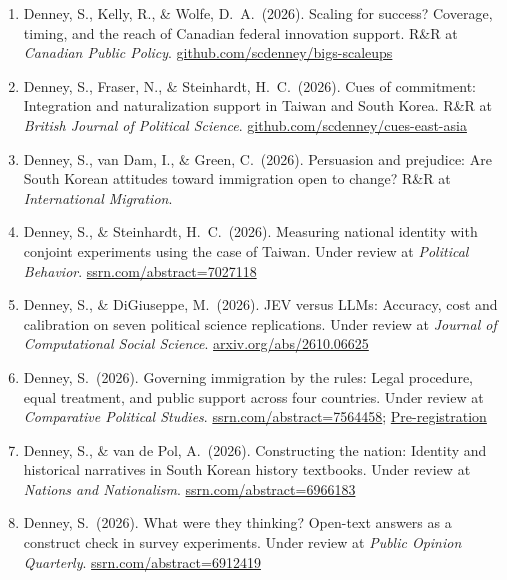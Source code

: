 \documentclass[11pt, a4paper]{article}
\begin{document}
\begin{enumerate}[itemsep=0.15em]
  \item Denney, S., Kelly, R., \& Wolfe, D.\ A.\ (2026). Scaling for success? Coverage, timing, and the reach of Canadian federal innovation support. R\&R at \textit{Canadian Public Policy}. \href{https://github.com/scdenney/bigs-scaleups}{github.com/scdenney/bigs-scaleups}

  \item Denney, S., Fraser, N., \& Steinhardt, H.\ C.\ (2026). Cues of commitment: Integration and naturalization support in Taiwan and South Korea. R\&R at \textit{British Journal of Political Science}. \href{https://github.com/scdenney/cues-east-asia}{github.com/scdenney/cues-east-asia}

  \item Denney, S., van Dam, I., \& Green, C.\ (2026). Persuasion and prejudice: Are South Korean attitudes toward immigration open to change? R\&R at \textit{International Migration}.

  \item Denney, S., \& Steinhardt, H.\ C.\ (2026). Measuring national identity with conjoint experiments using the case of Taiwan. Under review at \textit{Political Behavior}. \href{https://ssrn.com/abstract=7027118}{ssrn.com/abstract=7027118}

  \item Denney, S., \& DiGiuseppe, M.\ (2026). JEV versus LLMs: Accuracy, cost and calibration on seven political science replications. Under review at \textit{Journal of Computational Social Science}. \href{https://arxiv.org/abs/2610.06625}{arxiv.org/abs/2610.06625}

  \item Denney, S.\ (2026). Governing immigration by the rules: Legal procedure, equal treatment, and public support across four countries. Under review at \textit{Comparative Political Studies}. \href{https://ssrn.com/abstract=7564458}{ssrn.com/abstract=7564458}; \href{https://scdenney.github.io/assets/preregistrations/procedural-legitimacy/}{Pre-registration}

  \item Denney, S., \& van de Pol, A.\ (2026). Constructing the nation: Identity and historical narratives in South Korean history textbooks. Under review at \textit{Nations and Nationalism}. \href{https://ssrn.com/abstract=6966183}{ssrn.com/abstract=6966183}

  \item Denney, S.\ (2026). What were they thinking? Open-text answers as a construct check in survey experiments. Under review at \textit{Public Opinion Quarterly}. \href{https://ssrn.com/abstract=6912419}{ssrn.com/abstract=6912419}
\end{enumerate}
\end{document}
